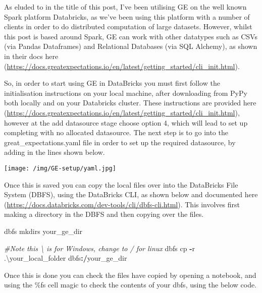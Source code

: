 \documentclass[]{article}
\newenvironment{Shaded}{\begin{snugshade}}{\end{snugshade}}
\newcommand{\CommentTok}[1]{\textcolor[rgb]{0.56,0.35,0.01}{\textit{#1}}}
\newcommand{\ErrorTok}[1]{\textcolor[rgb]{0.64,0.00,0.00}{\textbf{#1}}}
\newcommand{\NormalTok}[1]{#1}
\newcommand{\OperatorTok}[1]{\textcolor[rgb]{0.81,0.36,0.00}{\textbf{#1}}}
\begin{document}
As eluded to in the title of this post, I've been utilising GE on the
well known Spark platform Databricks, as we've been using this platform
with a number of clients in order to do distributed computation of large
datasets. However, whilst this post is based around Spark, GE can work
with other datatypes such as CSVs (via Pandas Dataframes) and Relational
Databases (via SQL Alchemy), as shown in their docs here
(\url{https://docs.greatexpectations.io/en/latest/getting_started/cli_init.html}).

So, in order to start using GE in DataBricks you must first follow the
initialisation instructions on your local machine, after downloading
from PyPy both locally and on your Databricks cluster. These
instructions are provided here
(\url{https://docs.greatexpectations.io/en/latest/getting_started/cli_init.html}),
however at the add datasource stage choose option 4, which will lead to
set up completing with no allocated datasource. The next step is to go
into the great\_expectations.yaml file in order to set up the required
datasource, by adding in the lines shown below.

\texttt{[image: /img/GE-setup/yaml.jpg]}

Once this is saved you can copy the local files over into the DataBricks
File System (DBFS), using the DataBricks CLI, as shown below and
documented here
(\url{https://docs.databricks.com/dev-tools/cli/dbfs-cli.html}). This
involves first making a directory in the DBFS and then copying over the
files.

\begin{Shaded}
\begin{Highlighting}[]
\NormalTok{dbfs mkdirs your_ge_dir}

\CommentTok{#Note this \textbackslash{} is for Windows, change to / for linux}
\NormalTok{dbfs cp }\OperatorTok{-}\NormalTok{r .\textbackslash{}your_local_folder dbfs}\OperatorTok{:}\ErrorTok{/}\NormalTok{your_ge_dir}
\end{Highlighting}
\end{Shaded}

Once this is done you can check the files have copied by opening a
notebook, and using the \%fs cell magic to check the contents of your
dbfs, using the below code.

\begin{Shaded}
\end{Shaded}
\end{document}

